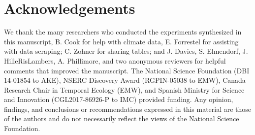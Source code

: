 \documentclass{article}
\begin{document}
\section*{Acknowledgements}
We thank the many researchers who conducted the experiments synthesized in this manuscript, B. Cook for help with climate data, E. Forrestel for assisting with data scraping; C. Zohner for sharing tables; and J. Davies, S. Elmendorf, J. HilleRisLambers, A. Phillimore, and two anonymous reviewers for helpful comments that improved the manuscript. The National Science Foundation (DBI 14-01854 to AKE), NSERC Discovery Award (RGPIN-05038 to EMW), Canada Research Chair in Temporal Ecology (EMW), and Spanish Ministry for Science and Innovation (CGL2017-86926-P to IMC) provided funding. Any opinion, findings, and conclusions or recommendations expressed in this material are those of the authors and do not necessarily reflect the views of the National Science Foundation.
%
\newpage
\end{document}
